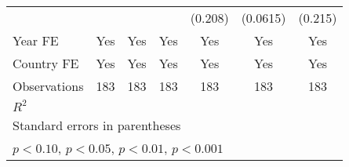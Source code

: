 \begin{table}[htbp]
\begin{tabular}{l*{6}{c}}
                &                  &                  &                  &  (0.208)         & (0.0615)         &  (0.215)         \\
\addlinespace
Year FE         &      Yes         &      Yes         &      Yes         &      Yes         &      Yes         &      Yes         \\
\addlinespace
Country FE      &      Yes         &      Yes         &      Yes         &      Yes         &      Yes         &      Yes         \\
\midrule
Observations    &      183         &      183         &      183         &      183         &      183         &      183         \\
\(R^{2}\)       &                  &                  &                  &                  &                  &                  \\
\bottomrule
\multicolumn{7}{l}{\footnotesize Standard errors in parentheses}\\
\multicolumn{7}{l}{\footnotesize \sym{+} \(p<0.10\), \sym{*} \(p<0.05\), \sym{**} \(p<0.01\), \sym{***} \(p<0.001\)}\\
\end{tabular}
\end{table}
